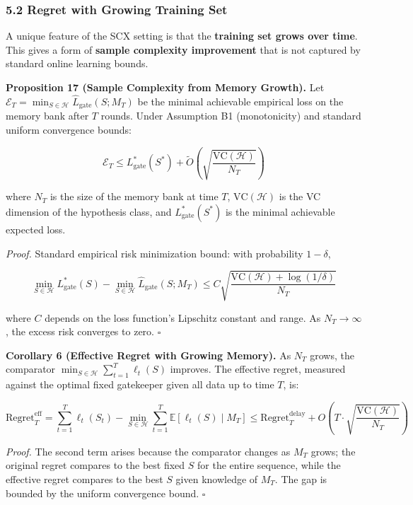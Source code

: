 \documentclass[
  12pt,
]{ctexart}
\begin{document}
\subsubsection{5.2 Regret with Growing Training
Set}\label{regret-with-growing-training-set}

A unique feature of the SCX setting is that the \textbf{training set
grows over time}. This gives a form of \textbf{sample complexity
improvement} that is not captured by standard online learning bounds.

\textbf{Proposition 17 (Sample Complexity from Memory Growth).} Let
\(\mathcal{E}_T = \min_{S \in \mathcal{H}} \hat{L}_{\text{gate}}(S; M_T)\)
be the minimal achievable empirical loss on the memory bank after \(T\)
rounds. Under Assumption B1 (monotonicity) and standard uniform
convergence bounds:

\[\mathcal{E}_T \leq L_{\text{gate}}^*(S^*) + \tilde{O}\left( \sqrt{\frac{\text{VC}(\mathcal{H})}{N_T}} \right)\]

where \(N_T\) is the size of the memory bank at time \(T\),
\(\text{VC}(\mathcal{H})\) is the VC dimension of the hypothesis class,
and \(L_{\text{gate}}^*(S^*)\) is the minimal achievable expected loss.

\emph{Proof.} Standard empirical risk minimization bound: with
probability \(1 - \delta\),

\[\min_{S \in \mathcal{H}} L_{\text{gate}}^*(S) - \min_{S \in \mathcal{H}} \hat{L}_{\text{gate}}(S; M_T) \leq C \sqrt{\frac{\text{VC}(\mathcal{H}) + \log(1/\delta)}{N_T}}\]

where \(C\) depends on the loss function's Lipschitz constant and range.
As \(N_T \to \infty\), the excess risk converges to zero. \(\square\)

\textbf{Corollary 6 (Effective Regret with Growing Memory).} As \(N_T\)
grows, the comparator
\(\min_{S \in \mathcal{H}} \sum_{t=1}^T \ell_t(S)\) improves. The
effective regret, measured against the optimal fixed gatekeeper given
all data up to time \(T\), is:

\[\text{Regret}_T^{\text{eff}} = \sum_{t=1}^T \ell_t(S_t) - \min_{S \in \mathcal{H}} \sum_{t=1}^T \mathbb{E}[\ell_t(S) \mid M_T] \leq \text{Regret}_T^{\text{delay}} + O\left( T \cdot \sqrt{\frac{\text{VC}(\mathcal{H})}{N_T}} \right)\]

\emph{Proof.} The second term arises because the comparator changes as
\(M_T\) grows; the original regret compares to the best fixed \(S\) for
the entire sequence, while the effective regret compares to the best
\(S\) given knowledge of \(M_T\). The gap is bounded by the uniform
convergence bound. \(\square\)
\end{document}
